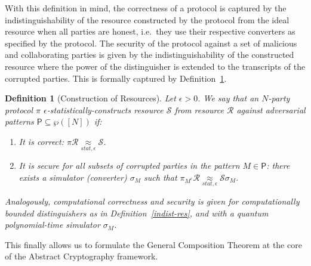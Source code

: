 \documentclass[12pt]{iopart}
\renewcommand{\1}{\mathds{1}}
\newtheorem{definition}{Definition}
\begin{document}
With this definition in mind, the correctness of a protocol is captured by the indistinguishability of the resource constructed by the protocol from the ideal resource when all parties are honest, i.e.~they use their respective converters as specified by the protocol.
The security of the protocol against a set of malicious and collaborating parties is given by the indistinguishability of the constructed resource where the power of the distinguisher is extended to the transcripts of the corrupted parties.
This is formally captured by Definition~\ref{const-sec-def}.

\begin{definition}[Construction of Resources]
\label{const-sec-def}
Let $\epsilon > 0$.  
We say that an $N$-party protocol $\pi$ $\epsilon$-statistically-constructs resource $\mathcal{S}$ from resource $\mathcal{R}$ against adversarial patterns $\mathsf{P} \subseteq \wp([N])$ if:
\begin{enumerate}
\item It is correct: $\pi \mathcal{R} \!\!\!\underset{\mathit{stat}, \epsilon}{\approx}\!\!\! \mathcal{S}$.
\item It is secure for all subsets of corrupted parties in the pattern $M \in \mathsf{P}$: there exists a simulator (converter) $\sigma_M$ such that $\pi_{M^c}\mathcal{R} \!\!\!\underset{\mathit{stat}, \epsilon}{\approx}\!\!\! \mathcal{S} \sigma_M$.
\end{enumerate}
Analogously, computational correctness and security is given for computationally bounded distinguishers as in Definition~\ref{indist-res}, and with a quantum polynomial-time simulator $\sigma_M$.
\end{definition}

This finally allows us to formulate the General Composition Theorem at the core of the Abstract Cryptography framework.
\end{document}
